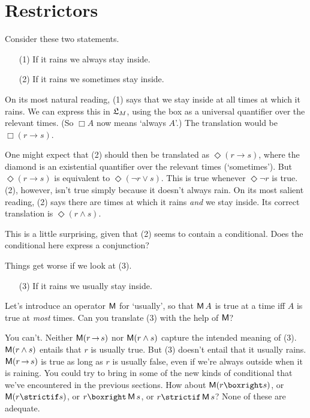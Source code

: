 \fi


\section{Restrictors}
\label{sec:restrictor-analysis}

Consider these two statements.
\begin{enumerate}[leftmargin=10mm]
  \itemsep-1mm
  \item[(1)] If it rains we always stay inside.
  \item[(2)] If it rains we sometimes stay inside.
\end{enumerate}
On its most natural reading, (1) says that we stay inside at all times at which
it rains. We can express this in $\mathfrak{L}_{M}$, using the box as a universal
quantifier over the relevant times. (So $\Box A$ now means `always $A$'.) The
translation would be $\Box(r \to s)$.

One might expect that (2) should then be translated as $\Diamond(r \to s)$,
where the diamond is an existential quantifier over the relevant times
(`sometimes'). But $\Diamond(r \to s)$ is equivalent to
$\Diamond(\neg r \lor s)$. This is true whenever $\Diamond \neg r$ is true. (2),
however, isn't true simply because it doesn't always rain. On its most salient
reading, (2) says there are times at which it rains \emph{and} we stay inside.
Its correct translation is $\Diamond(r \land s)$.

This is a little surprising, given that (2) seems to contain a conditional. Does
the conditional here express a conjunction?

Things get worse if we look at (3).
\begin{enumerate}[leftmargin=10mm]
  \item[(3)] If it rains we usually stay inside.
\end{enumerate}
Let's introduce an operator $\operatorname{\mathsf{M}}$ for `usually', so that $\operatorname{\mathsf{M}} A$ is true
at a time iff $A$ is true at \emph{most} times. Can you translate (3)
with the help of $\operatorname{\mathsf{M}}$?

You can't. Neither $\Mostly(r \to s)$ nor $\operatorname{\mathsf{M}}(r \land s)$ capture the
intended meaning of (3). $\operatorname{\mathsf{M}}(r \land s)$ entails that $r$ is usually true.
But (3) doesn't entail that it usually rains. $\Mostly(r \to s)$ is true as long
as $r$ is usually false, even if we're always outside when it is raining.
You could try to bring in some of the new kinds of conditional that we've
encountered in the previous sections. How about $\Mostly(r \boxright s)$, or
$\Mostly(r \strictif s)$, or $r \boxright \Mostly s$, or
$r \strictif \Mostly s$? None of these are adequate.


